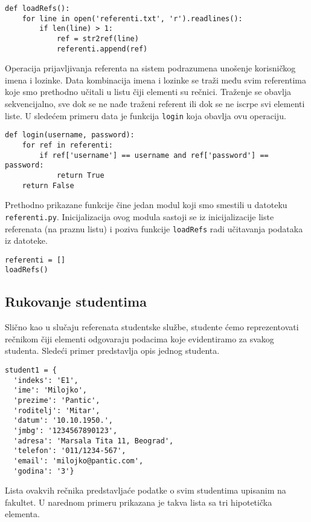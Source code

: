 \documentclass[a4paper]{article}
\begin{document}
\begin{verbatim}
def loadRefs():
    for line in open('referenti.txt', 'r').readlines():
        if len(line) > 1:
            ref = str2ref(line)
            referenti.append(ref)
\end{verbatim}

Operacija prijavljivanja referenta na sistem podrazumena unošenje korisničkog
imena i lozinke. Data kombinacija imena i lozinke se traži među svim referentima
koje smo prethodno učitali u listu čiji elementi su rečnici. Traženje se obavlja
sekvencijalno, sve dok se ne nađe traženi referent ili dok se ne iscrpe svi
elementi liste. U sledećem primeru data je funkcija \texttt{login} koja obavlja
ovu operaciju.

\begin{verbatim}
def login(username, password):
    for ref in referenti:
        if ref['username'] == username and ref['password'] == password:
            return True
    return False
\end{verbatim}

Prethodno prikazane funkcije čine jedan modul koji smo smestili u datoteku
\texttt{referenti.py}. Inicijalizacija ovog modula sastoji se iz inicijalizacije
liste referenata (na praznu listu) i poziva funkcije \texttt{loadRefs} radi učitavanja
podataka iz datoteke.

\begin{verbatim}
referenti = []
loadRefs()
\end{verbatim}

\subsection{Rukovanje studentima}

Slično kao u slučaju referenata studentske službe, studente ćemo reprezentovati
rečnikom čiji elementi odgovaraju podacima koje evidentiramo za svakog studenta.
Sledeći primer predstavlja opis jednog studenta.

\begin{verbatim}
student1 = {
  'indeks': 'E1',
  'ime': 'Milojko',
  'prezime': 'Pantic',
  'roditelj': 'Mitar',
  'datum': '10.10.1950.',
  'jmbg': '1234567890123',
  'adresa': 'Marsala Tita 11, Beograd',
  'telefon': '011/1234-567',
  'email': 'milojko@pantic.com',
  'godina': '3'}
\end{verbatim}

Lista ovakvih rečnika predstavljaće podatke o svim studentima upisanim na
fakultet. U narednom primeru prikazana je takva lista sa tri hipotetička
elementa.
\end{document}
